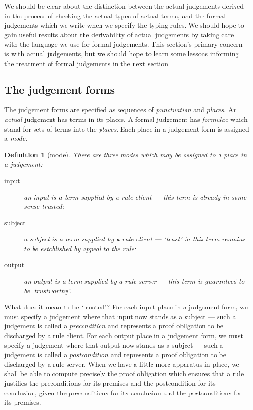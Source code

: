 \documentclass{jfp1}
\newtheorem{definition}[theorem]{Definition}
\begin{document}
We should be clear about the distinction between the actual judgements
derived in the process of checking the actual types of actual terms,
and the formal judgements which we write when we specify the typing
rules. We should hope to gain useful results about the derivability
of actual judgements by taking care with the language we use for
formal judgements. This section's primary concern is with actual
judgements, but we should hope to learn some lessons informing
the treatment of formal judgements in the next section.


\subsection{The judgement forms}

The judgement forms are specified as sequences of \emph{punctuation}
and \emph{places}. An \emph{actual} judgement has terms in its places.
A formal judgement has \emph{formulae} which stand for sets of terms into the
\emph{places}. Each place in a judgement form is assigned a \emph{mode}.

\begin{definition}[mode]
  There are three modes which may be assigned to a place in a judgement:
  \begin{description}
  \item[input] an input is a term supplied by a rule client ---
    this term is already in some sense trusted;
  \item[subject] a subject is a term supplied by a rule client ---
    `trust' in this term remains to be established by appeal to the rule;
  \item[output] an output is a term supplied by a rule server ---
    this term is guaranteed to be `trustworthy'.
  \end{description}
\end{definition}

What does it mean to be `trusted'? For each input place in a judgement
form, we must specify a judgement where that input now stands as a
subject --- such a judgement is called a \emph{precondition} and
represents a proof obligation to be discharged by a rule client. For
each output place in a judgement form, we must specify a judgement
where that output now stands as a subject --- such a judgement is
called a \emph{postcondition} and represents a proof obligation to be
discharged by a rule server. When we have a little more apparatus in
place, we shall be able to compute precisely the proof obligation which ensures
that a rule justifies the preconditions for its premises and the postcondition
for its conclusion, given the preconditions for its conclusion and the postconditions
for its premises.
\end{document}
